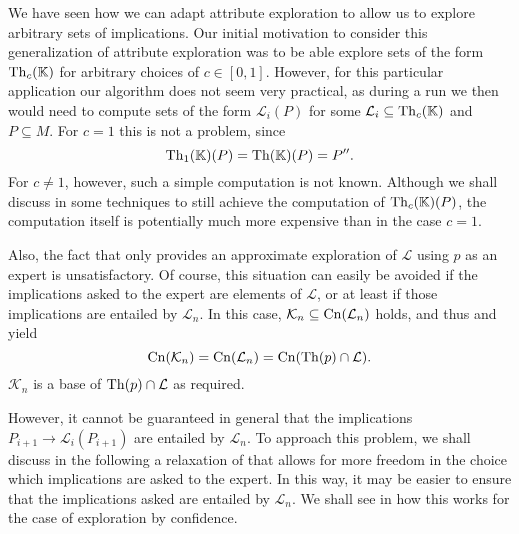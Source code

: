 We have seen how we can adapt attribute exploration to allow us to explore arbitrary sets
of implications.  Our initial motivation to consider this generalization of attribute
exploration was to be able explore sets of the form $\operatorname{Th}_{c}({\mathbb{K}})$ for arbitrary
choices of $c \in [0,1]$.  However, for this particular application our algorithm does not
seem very practical, as during a run we then would need to compute sets of the form
$\mathcal{L}_{i}(P)$ for some $\mathcal{L}_{i} \subseteq \operatorname{Th}_{c}({\mathbb{K}})$ and $P \subseteq
M$.  For $c = 1$ this is not a problem, since
\begin{equation*}
  \operatorname{Th}_{1}({\mathbb{K}})(P) = \operatorname{Th}({\mathbb{K}})(P) = P''.
\end{equation*}
For $c \neq 1$, however, such a simple computation is not known.  Although we shall
discuss in  some techniques to still achieve the computation of
$\operatorname{Th}_{c}({\mathbb{K}})(P)$, the computation itself is potentially much more expensive than in
the case $c = 1$.

Also, the fact that  only provides an approximate
exploration of $\mathcal{L}$ using $p$ as an expert is unsatisfactory.  Of course, this
situation can easily be avoided if the implications asked to the expert are elements of
$\mathcal{L}$, or at least if those implications are entailed by $\mathcal{L}_{n}$.  In
this case, $\mathcal{K}_{n} \subseteq \operatorname{Cn}(\mathcal{L}_{n})$ holds, and thus
 and
 yield
\begin{equation*}
  \operatorname{Cn}(\mathcal{K}_{n}) = \operatorname{Cn}(\mathcal{L}_{n}) = \operatorname{Cn}(\operatorname{Th}(p) \cap \mathcal{L}).
\end{equation*}
\ie $\mathcal{K}_{n}$ is a base of $\operatorname{Th}(p) \cap \mathcal{L}$ as required.

However, it cannot be guaranteed in general that the implications $P_{i+1} \to
\mathcal{L}_{i}(P_{i+1})$ are entailed by $\mathcal{L}_{n}$.  To approach this problem, we
shall discuss in the following a relaxation of  that allows
for more freedom in the choice which implications are asked to the expert.  In this way,
it may be easier to ensure that the implications asked are entailed by $\mathcal{L}_{n}$.
We shall see in  how this works for the case of exploration by
confidence.

